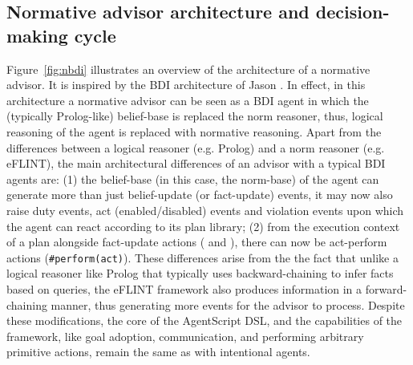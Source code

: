 \subsection{Normative advisor architecture and decision-making cycle}
Figure~\ref{fig:nbdi} illustrates an overview of the architecture of a normative advisor.
It is inspired by the BDI architecture of Jason \cite{Bordini2005}.
%
In effect, in this architecture a normative advisor can be seen as a BDI agent in which the (typically Prolog-like) belief-base is replaced the norm reasoner, thus, logical reasoning of the agent is replaced with normative reasoning. Apart from the differences between a logical reasoner (e.g. Prolog) and a norm reasoner (e.g. eFLINT), the main architectural differences of an advisor with a typical BDI agents are: (1) the belief-base (in this case, the norm-base) of the agent can generate more than just belief-update (or fact-update) events, it may now also raise duty events, act (enabled/disabled) events and violation events upon which the agent can react  according to its plan library; (2) from the execution context of a plan alongside fact-update actions ( and ), there can now be act-perform actions (\texttt{#perform(act)}). These differences arise from the the fact that unlike a logical reasoner like Prolog that typically uses backward-chaining to infer facts based on queries, the eFLINT framework also produces information in a forward-chaining manner, thus generating more events for the advisor to process.
%
Despite these modifications, the core of the AgentScript DSL, and the capabilities of the framework, like goal adoption, communication, and performing arbitrary primitive actions, remain the same as with intentional agents. 
%

